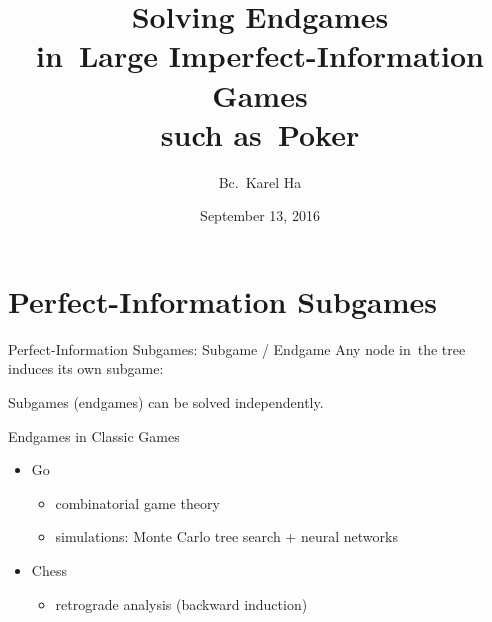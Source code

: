 \documentclass{beamer}
\title{Solving Endgames \\in~Large Imperfect-Information Games \\such as~Poker}
\date{September 13, 2016}
\author{Bc.~Karel Ha}
\institute{Department of~Applied Mathematics \\Charles University}
\theoremstyle{definition}
\begin{document}
  {
    \maketitle
  }

  \section{Perfect-Information Subgames}

  \begin{frame}{Perfect-Information Subgames: Subgame / Endgame}
    Any node in~the tree induces its own subgame:
    \pause
    \begin{figure}[H]
      \raggedleft
      \scriptsize
      \def\svgwidth{.8\textwidth}
      
    \end{figure}
    \pause

    Subgames (endgames) can be solved independently.
  \end{frame}

  \begin{frame}{Endgames in Classic Games}
    \pause
    \begin{itemize}[<+- | alert@+>]
      \item Go
        \begin{itemize}
          \item combinatorial game theory
          \item simulations: Monte Carlo tree search + neural networks
        \end{itemize}
      \item Chess
        \begin{itemize}
          \item retrograde analysis (backward induction)
        \end{itemize}
    \end{itemize}
  \end{frame}
\end{document}
